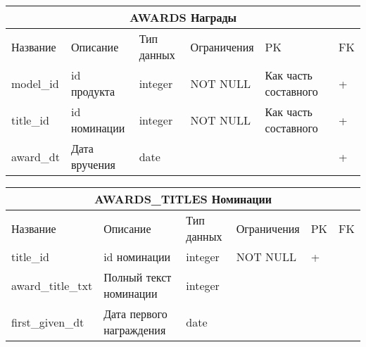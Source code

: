 \documentclass{article}
\begin{document}
\begin{tabular}{ |p{4cm}|p{4cm}|p{2.5cm}|p{3.5cm}|p{2cm}|p{1cm}| }
\hline
\multicolumn{6}{|c|}{AWARDS Награды} \\
\hline
Название & Описание & Тип данных & Ограничения & PK & FK\\
\hline
model\_id                           &   %
id продукта                         &   %
integer                             &   %
NOT NULL                            &   %
Как часть составного                &   %
 +                                  \\  %
\hline
title\_id                           &   %
id номинации                        &   %
integer                             &   %
NOT NULL                            &   %
Как часть составного                &   %
 +                                  \\  %
\hline
award\_dt                           &   %
Дата вручения                       &   %
date                                &   %
                                    &   %
                                    &   %
 +                                  \\  %
\hline
\end{tabular}

\begin{tabular}{ |p{4cm}|p{4cm}|p{2.5cm}|p{3.5cm}|p{2cm}|p{1cm}| }
\hline
\multicolumn{6}{|c|}{AWARDS\_TITLES Номинации} \\
\hline
Название & Описание & Тип данных & Ограничения & PK & FK\\
\hline
title\_id                           &   %
id номинации                        &   %
integer                             &   %
NOT NULL                            &   %
 +                                  &   %
                                    \\  %
\hline
award\_title\_txt                   &   %
Полный текст номинации              &   %
integer                             &   %
                                    &   %
                                    &   %
                                    \\  %
\hline
first\_given\_dt                    &   %
Дата первого награждения            &   %
date                                &   %
                                    &   %
                                    &   %
                                    \\  %
\hline
\end{tabular}
\end{document}
